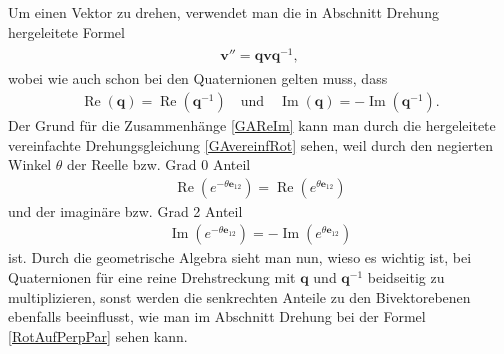 Um einen Vektor zu drehen, verwendet man die in Abschnitt Drehung hergeleitete Formel 
\begin{align} \label{QuatRotGA}
\begin{split} 
\mathbf{v}'' = \mathbf{qvq}^{-1},
\end{split}
\end{align}
wobei wie auch schon bei den Quaternionen gelten muss, dass
\begin{align} \label{GAReIm}
\operatorname{Re}(\mathbf{q}) = \operatorname{Re}(\mathbf{q}^{-1}) \quad\text{und}\quad \operatorname{Im}(\mathbf{q}) = -\operatorname{Im}(\mathbf{q}^{-1}).
\end{align}
Der Grund für die Zusammenhänge \eqref{GAReIm} kann man durch die hergeleitete vereinfachte Drehungsgleichung \eqref{GAvereinfRot} sehen, weil durch den negierten Winkel $\theta$ der Reelle bzw. Grad 0 Anteil
\begin{align}
\operatorname{Re}(e^{-\theta \mathbf{e}_{12}}) = \operatorname{Re}(e^{\theta \mathbf{e}_{12}})
\end{align}
und der imaginäre bzw. Grad 2 Anteil
\begin{align}
\operatorname{Im}(e^{-\theta \mathbf{e}_{12}}) = -\operatorname{Im}(e^{\theta \mathbf{e}_{12}})
\end{align}
ist. Durch die geometrische Algebra sieht man nun, wieso es wichtig ist, bei Quaternionen für eine reine Drehstreckung mit $\mathbf{q}$ und $\mathbf{q}^{-1}$ beidseitig zu multiplizieren, sonst werden die senkrechten Anteile zu den Bivektorebenen ebenfalls beeinflusst, wie man im Abschnitt Drehung bei der Formel \eqref{RotAufPerpPar} sehen kann.
